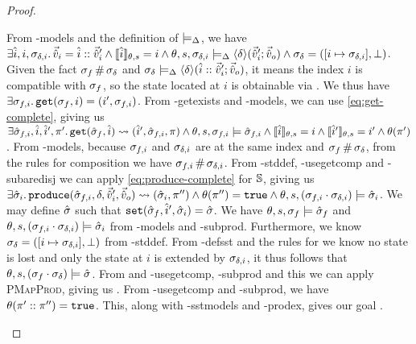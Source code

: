 \begin{proof}
\begin{hypvlist}
 From \hyp{models} and the definition of $\models_{\Delta}$, we have $\exists \hat{i},i,\sigma_{\delta,i} \ldotp \vec{\hat{v}}_i=\hat{i}::\vec{\hat{v}}_i' \land \llbracket\hat{i}\rrbracket_{\theta,s}=i \land \theta,s,\sigma_{\delta,i}\models_{\Delta} \left<\delta\right>\!(\vec{\hat{v}}_i';\vec{\hat{v}}_o) \land \sigma_\delta=([i\mapsto \sigma_{\delta,i}],\bot)$.
 Given the fact $\sigma_f\operatorname{\#}\sigma_\delta$ and $\sigma_\delta\models_{\Delta}\left<\delta\right>\!(\hat{i}::\vec{\hat{v}}_i';\vec{\hat{v}}_o)$, it means the index $i$ is compatible with $\sigma_f$, so the state located at $i$ is obtainable via . We thus have $\exists \sigma_{f,i} \ldotp \texttt{get}(\sigma_f,i)=(i',\sigma_{f,i})$.
 From \hyp{getexists} and \hyp{models}, we can use \ref{eq:get-complete}, giving us $\exists \hat{\sigma}_{f,i},\hat{i},\hat{i}', \pi'\ldotp \texttt{get}(\hat{\sigma}_f,\hat{i})\rightsquigarrow(\hat{i}',\hat{\sigma}_{f,i},\pi) \land \theta,s,\sigma_{f,i}\models\hat{\sigma}_{f,i} \land \llbracket\hat{i}\rrbracket_{\theta,s}=i \land \llbracket\hat{i}'\rrbracket_{\theta,s}=i' \land \theta(\pi')$.
 From \hyp{models}, because $\sigma_{f,i}$ and $\sigma_{\delta,i}$ are at the same index and $\sigma_f\operatorname{\#}\sigma_\delta$, from the rules for composition we have $\sigma_{f,i}\operatorname{\#}\sigma_{\delta,i}$.
 From \hyp{stddef}, \hyp{usegetcomp} and \hyp{subaredisj} we can apply \ref{eq:produce-complete} for $\mathbb S$, giving us $\exists \hat{\sigma}_i\ldotp {\ensuremath{\texttt{produce}(\hat{\sigma}_{f,i},\delta,\vec{\hat{v}}_i',\vec{\hat{v}}_o)\rightsquigarrow (\hat{\sigma}_i,\pi'')}}\land\theta(\pi'')=\texttt{true}\land \theta,s,(\sigma_{f,i}\cdot\sigma_{\delta,i})\models\hat{\sigma}_i$.
 We may define $\hat{\sigma}$ such that $\texttt{set}(\hat{\sigma}_f,\hat{i}',\hat{\sigma}_i)=\hat{\sigma}$.
 We have $\theta, s, \sigma_f \models \hat{\sigma}_f$ and ${\theta,s,(\sigma_{f,i}\cdot\sigma_{\delta,i})\models\hat{\sigma}_i}$ from \hyp{models} and \hyp{subprod}. Furthermore, we know $\sigma_\delta=([i\mapsto \sigma_{\delta,i}],\bot)$ from \hyp{stddef}. From \hyp{defsst} and the rules for  we know no state is lost and only the state at $i$ is extended by $\sigma_{\delta,i}$, it thus follows that $\theta,s,(\sigma_f\cdot\sigma_\delta)\models\hat{\sigma}$.%
 From and \hyp{usegetcomp}, \hyp{subprod} and this we can apply \textsc{PMapProd}, giving us .
 From \hyp{usegetcomp} and \hyp{subprod}, we have $\theta(\pi'::\pi'')=\texttt{true}$. This, along with \hyp{sstmodels} and \hyp{prodex}, gives our goal .
\end{hypvlist}

\pfcase{$\delta = \domainset$}


\end{proof}
